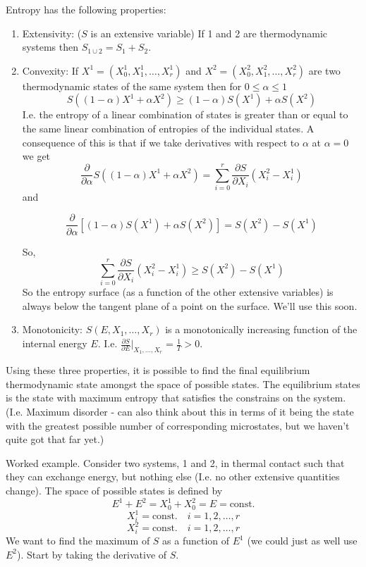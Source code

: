 \documentclass{article}
\begin{document}
Entropy has the following properties:
\begin{enumerate}
\item Extensivity: ($S$ is an extensive variable) If 1 and 2 are thermodynamic systems then $S_{1\cup2}=S_1+S_2$.
\item Convexity: If $X^1=(X_0^1,X_1^1,\ldots,X_r^1)$ and  $X^2=(X_0^2,X_1^2,\ldots,X_r^2)$ are two thermodynamic states of the same system then for $0\leq\alpha\leq1$
$$ S((1-\alpha)X^1+\alpha X^2)\geq (1-\alpha)S(X^1)+\alpha S(X^2) $$
I.e. the entropy of a linear combination of states is greater than or equal to the same linear combination of entropies of the individual states.
A consequence of this is that if we take derivatives with respect to $\alpha$ at $\alpha=0$ we get
$$\frac{\partial}{\partial \alpha} S((1-\alpha)X^1+\alpha X^2) = \sum_{i=0}^r\frac{\partial S}{\partial X_i}(X_i^2-X_i^1)$$
and

$$\frac{\partial}{\partial \alpha} \left[ (1-\alpha)S(X^1)+\alpha S(X^2) \right] = S(X^2)-S(X^1)$$

So,
$$ \sum_{i=0}^r\frac{\partial S}{\partial X_i}(X_i^2-X_i^1)\geq  S(X^2)-S(X^1)$$
So the entropy surface (as a function of the other extensive variables) is always below the tangent plane of a point on the surface. We'll use this soon.
\item Monotonicity: $S(E,X_1,\ldots,X_r)$ is a monotonically increasing function of the internal energy $E$. I.e. $\frac{\partial S}{\partial E}\vert_{X_1,\ldots,X_r} = \frac{1}{T}>0$.
\end{enumerate}

Using these three properties, it is possible to find the final equilibrium thermodynamic state amongst the space of possible states. The equilibrium states is the state with maximum entropy that satisfies the constrains on the system. (I.e. Maximum disorder - can also think about this in terms of it being the state with the greatest possible number of corresponding microstates, but we haven't quite got that far yet.)

Worked example. Consider two systems, 1 and 2, in thermal contact such that they can exchange energy, but nothing else (I.e. no other extensive quantities change). The space of possible states is defined by 
$$E^1+E^2 = X_0^1+X_0^2 = E = \text{const.}$$
$$X_i^1 = \text{const.}\quad i=1,2,\ldots,r$$
$$X_i^2 = \text{const.}\quad i=1,2,\ldots,r$$
We want to find the maximum of $S$ as a function of $E^1$ (we could just as well use $E^2$). Start by taking the derivative of $S$.
\end{document}
